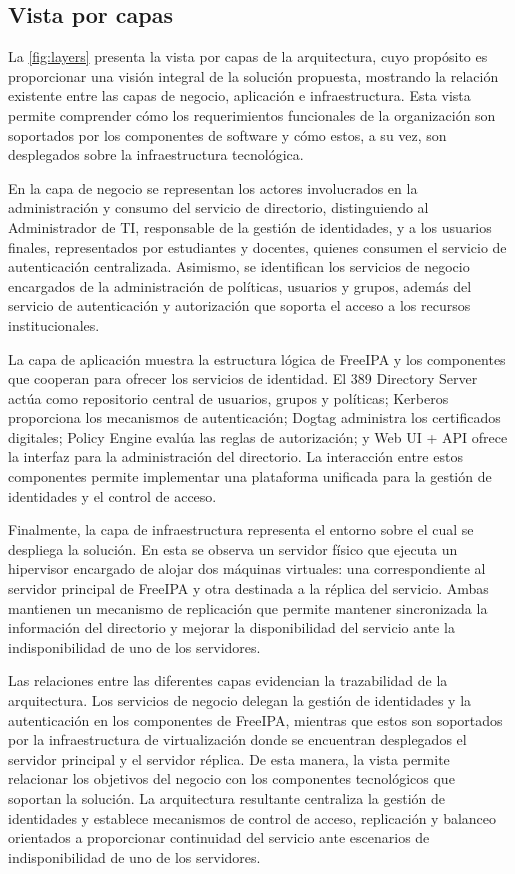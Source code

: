 \subsection{Vista por capas}

La \autoref{fig:layers} presenta la vista por capas de la arquitectura, cuyo propósito es proporcionar una visión integral de la solución propuesta, mostrando la relación existente entre las capas de negocio, aplicación e infraestructura. Esta vista permite comprender cómo los requerimientos funcionales de la organización son soportados por los componentes de software y cómo estos, a su vez, son desplegados sobre la infraestructura tecnológica.

En la capa de negocio se representan los actores involucrados en la administración y consumo del servicio de directorio, distinguiendo al Administrador de \ac{TI}, responsable de la gestión de identidades, y a los usuarios finales, representados por estudiantes y docentes, quienes consumen el servicio de autenticación centralizada. Asimismo, se identifican los servicios de negocio encargados de la administración de políticas, usuarios y grupos, además del servicio de autenticación y autorización que soporta el acceso a los recursos institucionales.

La capa de aplicación muestra la estructura lógica de FreeIPA y los componentes que cooperan para ofrecer los servicios de identidad. El 389 Directory Server actúa como repositorio central de usuarios, grupos y políticas; Kerberos proporciona los mecanismos de autenticación; Dogtag administra los certificados digitales; Policy Engine evalúa las reglas de autorización; y Web \acs{UI} + \ac{API} ofrece la interfaz para la administración del directorio. La interacción entre estos componentes permite implementar una plataforma unificada para la gestión de identidades y el control de acceso.

Finalmente, la capa de infraestructura representa el entorno sobre el cual se despliega la solución. En esta se observa un servidor físico que ejecuta un hipervisor encargado de alojar dos máquinas virtuales: una correspondiente al servidor principal de FreeIPA y otra destinada a la réplica del servicio. Ambas mantienen un mecanismo de replicación que permite mantener sincronizada la información del directorio y mejorar la disponibilidad del servicio ante la indisponibilidad de uno de los servidores.

Las relaciones entre las diferentes capas evidencian la trazabilidad de la arquitectura. Los servicios de negocio delegan la gestión de identidades y la autenticación en los componentes de FreeIPA, mientras que estos son soportados por la infraestructura de virtualización donde se encuentran desplegados el servidor principal y el servidor réplica. De esta manera, la vista permite relacionar los objetivos del negocio con los componentes tecnológicos que soportan la solución. La arquitectura resultante centraliza la gestión de identidades y establece mecanismos de control de acceso, replicación y balanceo orientados a proporcionar continuidad del servicio ante escenarios de indisponibilidad de uno de los servidores.

